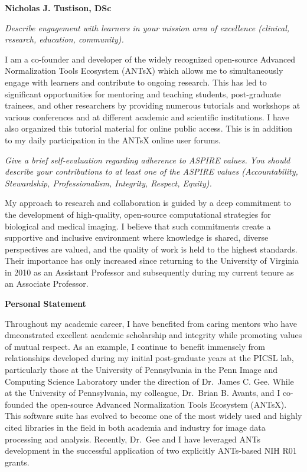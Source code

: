 \documentclass[
  11pt,
]{article}
\author{}
\date{\vspace{-2.5em}}
\begin{document}

\textbf{Nicholas J. Tustison, DSc}

\emph{Describe engagement with learners in your mission area of
excellence (clinical, research, education, community).}

I am a co-founder and developer of the widely recognized open-source
Advanced Normalization Tools Ecosystem (ANTsX) which allows me to
simultaneously engage with learners and contribute to ongoing research.
This has led to significant opportunities for mentoring and teaching
students, post-graduate trainees, and other researchers by providing
numerous tutorials and workshops at various conferences and at different
academic and scientific institutions. I have also organized this
tutorial material for online public access. This is in addition to my
daily participation in the ANTsX online user forums.

\emph{Give a brief self-evaluation regarding adherence to ASPIRE values.
You should describe your contributions to at least one of the ASPIRE
values (Accountability, Stewardship, Professionalism, Integrity,
Respect, Equity).}

My approach to research and collaboration is guided by a deep commitment
to the development of high-quality, open-source computational strategies
for biological and medical imaging. I believe that such commitments
create a supportive and inclusive environment where knowledge is shared,
diverse perspectives are valued, and the quality of work is held to the
highest standards. Their importance has only increased since returning
to the University of Virginia in 2010 as an Assistant Professor and
subsequently during my current tenure as an Associate Professor.

\textbf{Personal Statement}

Throughout my academic career, I have benefited from caring mentors who
have dmeonstrated excellent academic scholarship and integrity while
promoting values of mutual respect. As an example, I continue to benefit
immensely from relationships developed during my initial post-graduate
years at the PICSL lab, particularly those at the University of
Pennsylvania in the Penn Image and Computing Science Laboratory under
the direction of Dr.~James C. Gee. While at the University of
Pennsylvania, my colleague, Dr.~Brian B. Avants, and I co-founded the
open-source Advanced Normalization Tools Ecosystem (ANTsX). This
software suite has evolved to become one of the most widely used and
highly cited libraries in the field in both academia and industry for
image data processing and analysis. Recently, Dr.~Gee and I have
leveraged ANTs development in the successful application of two
explicitly ANTs-based NIH R01 grants.
\end{document}
